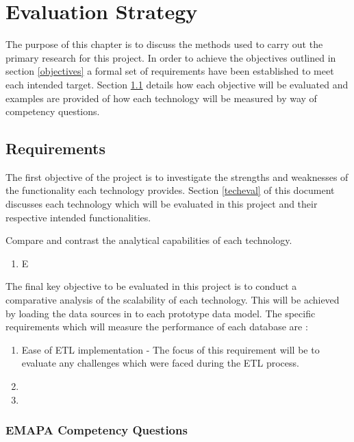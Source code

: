 \chapter{Evaluation Strategy}
The purpose of this chapter is to discuss the methods used to carry out the primary research for this project. In order to achieve the objectives outlined in section \ref{objectives} a formal set of requirements have been established to meet each intended target. Section \ref{requirements} details how each objective will be evaluated and examples are provided of how each technology will be measured by way of competency questions.

\section{Requirements}\label{requirements}

The first objective of the project is to investigate the strengths and weaknesses of the functionality each technology provides. Section \ref{techeval} of this document discusses each technology which will be evaluated in this project and their respective intended functionalities. 

Compare and contrast the analytical capabilities of each technology.

\begin{enumerate}
\item E
\end{enumerate}

The final key objective to be evaluated in this project is to conduct a comparative analysis of the scalability of each technology. This will be achieved by loading the data sources in to each prototype data model. The specific requirements which will measure the performance of each database are :

\begin{enumerate}
\item Ease of ETL implementation - The focus of this requirement will be to evaluate any challenges which were faced during the ETL process.
\item
\item
\end{enumerate}
\subsection{EMAPA Competency Questions}\label{competency}

